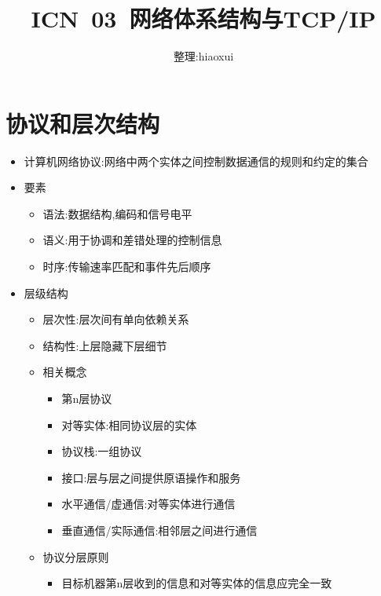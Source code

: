 \documentclass[a4paper,12pt,notitlepage]{article}
\begin{document}
\title{ICN\ 03\ 网络体系结构与TCP/IP}
\author{整理:hiaoxui}
\maketitle

\section{协议和层次结构}

\begin{itemize}
	\item 计算机网络协议:网络中两个实体之间控制数据通信的规则和约定的集合
	\item 要素
	\begin{itemize}
		\item 语法:数据结构,编码和信号电平
		\item 语义:用于协调和差错处理的控制信息
		\item 时序:传输速率匹配和事件先后顺序
	\end{itemize}
	\item 层级结构
	\begin{itemize}
		\item 层次性:层次间有单向依赖关系
		\item 结构性:上层隐藏下层细节
		\item 相关概念
		\begin{itemize}
			\item 第n层协议
			\item 对等实体:相同协议层的实体
			\item 协议栈:一组协议
			\item 接口:层与层之间提供原语操作和服务
			\item 水平通信/虚通信:对等实体进行通信
			\item 垂直通信/实际通信:相邻层之间进行通信
		\end{itemize}
		\item 协议分层原则
		\begin{itemize}
			\item 目标机器第n层收到的信息和对等实体的信息应完全一致
		\end{itemize}
	\end{itemize}
\end{itemize}
\end{document}
